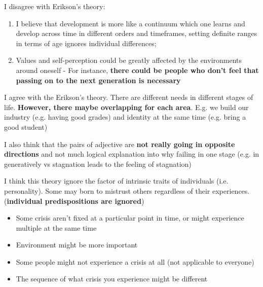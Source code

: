 \documentclass[../main/main.tex]{subfiles}
\begin{document}
\begin{example}
  I disagree with Erikson’s theory:
  \begin{enumerate}
    \item I believe that development is more like a continuum which one learns and develop across time in different orders and timeframes, setting definite ranges in terms of age ignores individual differences;
\item Values and self-perception could be greatly affected by the environments around oneself - For instance, \textbf{there could be people who don’t feel that passing on to the next generation is necessary}
  \end{enumerate}
\end{example}
\begin{example}
I agree with the Erikson's theory. There are different needs in different stages of life. \textbf{However, there maybe overlapping for each area}. E.g. we build our industry (e.g. having good grades) and identity at the same time (e.g. bring a good student)\end{example}
\begin{example}
I also think that the pairs of adjective are \textbf{not really going in opposite directions} and not much logical explanation into why failing in one stage (e.g. in generatively vs stagnation leads to the feeling of stagnation)
\end{example}
\begin{example}
I think this theory ignore the factor of intrinsic traits of individuals (i.e. personality). Some may born to mistrust others regardless of their experiences. (\textbf{individual predispositions are ignored})
\end{example}
\begin{remark}
  \begin{itemize}
    \item Some crisis aren't fixed at a particular point in time, or might experience multiple at the same time
    \item Environment might be more important
    \item Some people might not experience a crisis at all (not applicable to everyone)
          \item The sequence of what crisis you experience might be different
  \end{itemize}
\end{remark}
\end{document}
